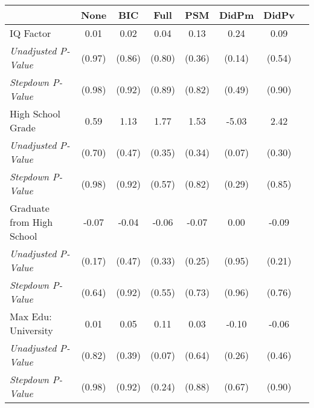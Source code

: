 \begin{tabular}{l c c c c c c c}
\toprule
 & None & BIC & Full & PSM & DidPm & DidPv \\
\midrule
IQ Factor & 0.01 & 0.02 & 0.04 & 0.13 & 0.24 & 0.09 \\
\quad \textit{Unadjusted P-Value} & (0.97) & (0.86) & (0.80) & (0.36) & (0.14) & (0.54) \\
\quad \textit{Stepdown P-Value} & (0.98) & (0.92) & (0.89) & (0.82) & (0.49) & (0.90) \\
High School Grade & 0.59 & 1.13 & 1.77 & 1.53 & -5.03 & 2.42 \\
\quad \textit{Unadjusted P-Value} & (0.70) & (0.47) & (0.35) & (0.34) & (0.07) & (0.30) \\
\quad \textit{Stepdown P-Value} & (0.98) & (0.92) & (0.57) & (0.82) & (0.29) & (0.85) \\
Graduate from High School & -0.07 & -0.04 & -0.06 & -0.07 & 0.00 & -0.09 \\
\quad \textit{Unadjusted P-Value} & (0.17) & (0.47) & (0.33) & (0.25) & (0.95) & (0.21) \\
\quad \textit{Stepdown P-Value} & (0.64) & (0.92) & (0.55) & (0.73) & (0.96) & (0.76) \\
Max Edu: University & 0.01 & 0.05 & 0.11 & 0.03 & -0.10 & -0.06 \\
\quad \textit{Unadjusted P-Value} & (0.82) & (0.39) & (0.07) & (0.64) & (0.26) & (0.46) \\
\quad \textit{Stepdown P-Value} & (0.98) & (0.92) & (0.24) & (0.88) & (0.67) & (0.90) \\
\bottomrule
\end{tabular}
